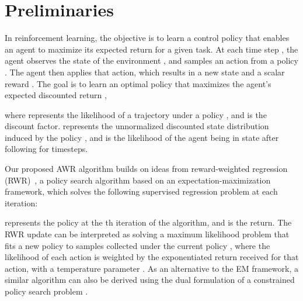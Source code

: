 \documentclass{article} \usepackage{iclr2020_conference,times}
\begin{document}
\section{Preliminaries}

In reinforcement learning, the objective is to learn a control policy that enables an agent to maximize its expected return for a given task. At each time step , the agent observes the state of the environment , and samples an action  from a policy . The agent then applies that action, which results in a new state  and a scalar reward . The goal is to learn an optimal policy that maximizes the agent's expected discounted return ,

where  represents the likelihood of a trajectory  under a policy , and  is the discount factor.  represents the unnormalized discounted state distribution induced by the policy  \citep{Sutton1998}, and  is the likelihood of the agent being in state  after following  for  timesteps.

Our proposed AWR algorithm builds on ideas from reward-weighted regression (RWR)~\citep{Peters2010REP}, a policy search algorithm based on an expectation-maximization framework, which solves the following supervised regression problem at each iteration:

 represents the policy at the th iteration of the algorithm, and  is the return. The RWR update can be interpreted as solving a maximum likelihood problem that fits a new policy  to samples collected under the current policy , where the likelihood of each action is weighted by the exponentiated return received for that action, with a temperature parameter .
As an alternative to the EM framework, a similar algorithm can also be derived using the dual formulation of a constrained policy search problem \citep{Peters2010REP}.
\end{document}
